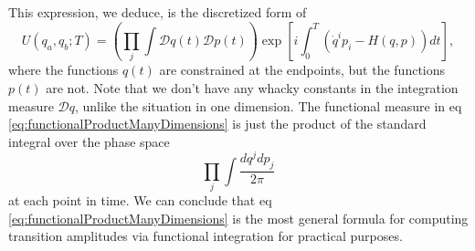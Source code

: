 This expression, we deduce, is the discretized form of
\begin{equation}\label{eq:functionalProductManyDimensions}
U(q_a,q_b;T) = \left(\prod_{j}\int\mathcal{D}q(t)\mathcal{D}p(t)\right)\exp\left[i\int^{T}_{0}(\dot{q}^{i}p_{i}-H(q,p))dt\right],
\end{equation}
where the functions $q(t)$ are constrained at the endpoints, but
the functions $p(t)$ are not. Note that we don't have any whacky
constants in the integration measure $\mathcal{D}q$, unlike the
situation in one dimension. The functional measure in eq
\eqref{eq:functionalProductManyDimensions} is just the product of
the standard integral over the phase space
\begin{equation}%
\prod_{j}\int\frac{dq^{j}dp_{j}}{2\pi}
\end{equation}
at each point in time. We can conclude that eq
\eqref{eq:functionalProductManyDimensions} is the most general
formula for computing transition amplitudes via functional
integration for practical purposes.

